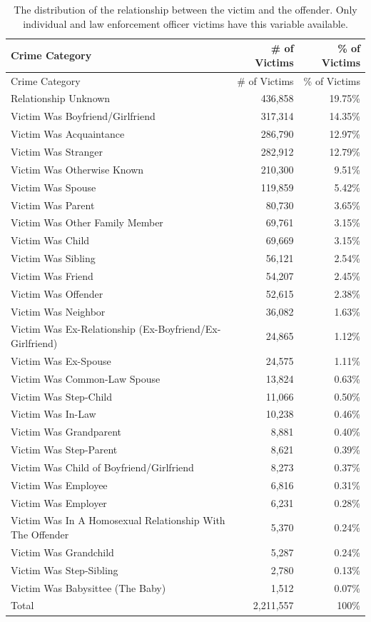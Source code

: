 \documentclass[
  12pt,
  openany]{book}
\begin{document}
\begin{longtable}[]{@{}lrr@{}}
\caption{\label{tab:victimRelationship}The distribution of the relationship between the victim and the offender. Only individual and law enforcement officer victims have this variable available.}\tabularnewline
\toprule
Crime Category & \# of Victims & \% of Victims\tabularnewline
\midrule
\endfirsthead
\toprule
Crime Category & \# of Victims & \% of Victims\tabularnewline
\midrule
\endhead
Relationship Unknown & 436,858 & 19.75\%\tabularnewline
Victim Was Boyfriend/Girlfriend & 317,314 & 14.35\%\tabularnewline
Victim Was Acquaintance & 286,790 & 12.97\%\tabularnewline
Victim Was Stranger & 282,912 & 12.79\%\tabularnewline
Victim Was Otherwise Known & 210,300 & 9.51\%\tabularnewline
Victim Was Spouse & 119,859 & 5.42\%\tabularnewline
Victim Was Parent & 80,730 & 3.65\%\tabularnewline
Victim Was Other Family Member & 69,761 & 3.15\%\tabularnewline
Victim Was Child & 69,669 & 3.15\%\tabularnewline
Victim Was Sibling & 56,121 & 2.54\%\tabularnewline
Victim Was Friend & 54,207 & 2.45\%\tabularnewline
Victim Was Offender & 52,615 & 2.38\%\tabularnewline
Victim Was Neighbor & 36,082 & 1.63\%\tabularnewline
Victim Was Ex-Relationship (Ex-Boyfriend/Ex-Girlfriend) & 24,865 & 1.12\%\tabularnewline
Victim Was Ex-Spouse & 24,575 & 1.11\%\tabularnewline
Victim Was Common-Law Spouse & 13,824 & 0.63\%\tabularnewline
Victim Was Step-Child & 11,066 & 0.50\%\tabularnewline
Victim Was In-Law & 10,238 & 0.46\%\tabularnewline
Victim Was Grandparent & 8,881 & 0.40\%\tabularnewline
Victim Was Step-Parent & 8,621 & 0.39\%\tabularnewline
Victim Was Child of Boyfriend/Girlfriend & 8,273 & 0.37\%\tabularnewline
Victim Was Employee & 6,816 & 0.31\%\tabularnewline
Victim Was Employer & 6,231 & 0.28\%\tabularnewline
Victim Was In A Homosexual Relationship With The Offender & 5,370 & 0.24\%\tabularnewline
Victim Was Grandchild & 5,287 & 0.24\%\tabularnewline
Victim Was Step-Sibling & 2,780 & 0.13\%\tabularnewline
Victim Was Babysittee (The Baby) & 1,512 & 0.07\%\tabularnewline
Total & 2,211,557 & 100\%\tabularnewline
\bottomrule
\end{longtable}
\end{document}
